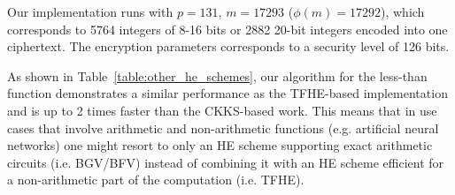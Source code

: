     Our implementation runs with $p=131$, $m=17293$ ($\phi(m)=17292$), which corresponds to 5764 integers of 8-16 bits or 2882 20-bit integers encoded into one ciphertext.
    The encryption parameters corresponds to a security level of 126 bits.
    
    As shown in Table~\ref{table:other_he_schemes}, our algorithm for the less-than function demonstrates a similar performance as the TFHE-based implementation and is up to 2 times faster than the CKKS-based work.
    This means that in use cases that involve arithmetic and non-arithmetic functions (e.g. artificial neural networks) one might resort to only an HE scheme supporting exact arithmetic circuits (i.e. BGV/BFV) instead of combining it with an HE scheme efficient for a non-arithmetic part of the computation (i.e. TFHE).

